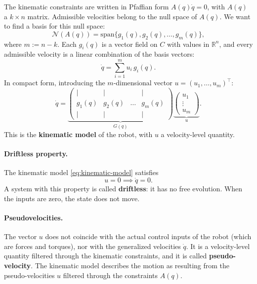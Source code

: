 The kinematic constraints are written in Pfaffian form
\( A(q) \dot{q} = 0 \), with \( A(q) \) a \( k \times n \) matrix.
Admissible velocities belong to the null space of \( A(q) \). We want
to find a basis for this null space:
\[
\mathcal{N}(A(q)) = \text{span}\{ g_1(q), g_2(q), \dots, g_m(q) \},
\]
where \( m := n - k \). Each \( g_i(q) \) is a vector field on \( C \)
with values in \( \mathbb{R}^n \), and every admissible velocity is a
linear combination of the basis vectors:
\begin{equation}
    \dot{q} = \sum_{i=1}^{m} u_i \, g_i(q).
\end{equation}
In compact form, introducing the \( m \)-dimensional vector
\( u = (u_1, \dots, u_m)^\top \):
\begin{equation}
\label{eq:kinematic-model}
    \dot{q} = \underbrace{
    \begin{pmatrix}
        | & | & & | \\
        g_1(q) & g_2(q) & \dots & g_m(q) \\
        | & | & & |
    \end{pmatrix}}_{G(q)}
    \underbrace{
    \begin{pmatrix}
        u_1 \\ \vdots \\ u_m
    \end{pmatrix}}_{u}.
\end{equation}
This is the \textbf{kinematic model} of the robot, with \( u \) a
velocity-level quantity.

\paragraph{Driftless property.}
The kinematic model \cref{eq:kinematic-model} satisfies
\[
u = 0 \implies \dot{q} = 0.
\]
A system with this property is called \textbf{driftless}: it has no
free evolution. When the inputs are zero, the state does not move.

\paragraph{Pseudovelocities.}
The vector \( u \) does not coincide with the actual control inputs of
the robot (which are forces and torques), nor with the generalized
velocities \( \dot{q} \). It is a velocity-level quantity filtered
through the kinematic constraints, and it is called
\textbf{pseudo-velocity}. The kinematic model describes the motion as
resulting from the pseudo-velocities \( u \) filtered through the
constraints \( A(q) \).

